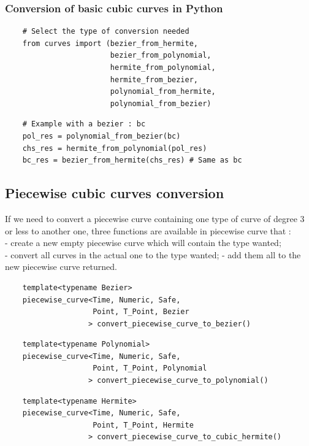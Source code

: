 \documentclass{article}
\begin{document}
    \subsubsection{Conversion of basic cubic curves in Python}
    \begin{lstlisting}
    # Select the type of conversion needed
    from curves import (bezier_from_hermite, 
                        bezier_from_polynomial, 
                        hermite_from_polynomial,
                        hermite_from_bezier, 
                        polynomial_from_hermite, 
                        polynomial_from_bezier)
    \end{lstlisting}
    \begin{lstlisting}
    # Example with a bezier : bc
    pol_res = polynomial_from_bezier(bc)
    chs_res = hermite_from_polynomial(pol_res)
    bc_res = bezier_from_hermite(chs_res) # Same as bc
    \end{lstlisting}
    
\subsection{Piecewise cubic curves conversion}
    If we need to convert a piecewise curve containing one type of curve of 
    degree 3 or less to another one, three functions are available 
    in piecewise curve that :\\
    - create a new empty piecewise curve which will contain the type wanted;\\
    - convert all curves in the actual one to the type wanted;
    - add them all to the new piecewise curve returned.
    \begin{lstlisting}
    template<typename Bezier>
    piecewise_curve<Time, Numeric, Safe, 
                    Point, T_Point, Bezier
                   > convert_piecewise_curve_to_bezier()
    \end{lstlisting}
    \begin{lstlisting}
    template<typename Polynomial>
    piecewise_curve<Time, Numeric, Safe, 
                    Point, T_Point, Polynomial
                   > convert_piecewise_curve_to_polynomial()
    \end{lstlisting}
    \begin{lstlisting}
    template<typename Hermite>
    piecewise_curve<Time, Numeric, Safe, 
                    Point, T_Point, Hermite
                   > convert_piecewise_curve_to_cubic_hermite()
    \end{lstlisting}
    
\end{document}
